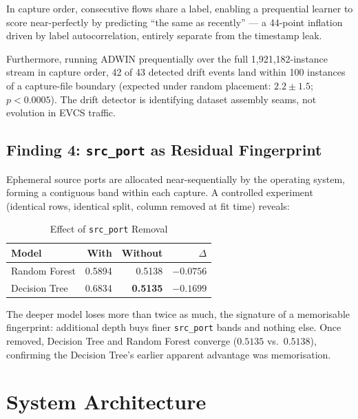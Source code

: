 \documentclass[conference]{IEEEtran}
\newcommand{\col}[1]{\texttt{\small #1}}
\begin{document}
In capture order, consecutive flows share a label, enabling a prequential learner to score near-perfectly by predicting ``the same as recently'' --- a 44-point inflation driven by label autocorrelation, entirely separate from the timestamp leak.

Furthermore, running ADWIN prequentially over the full 1,921,182-instance stream in capture order, 42 of 43 detected drift events land within 100 instances of a capture-file boundary (expected under random placement: $2.2 \pm 1.5$; $p < 0.0005$). The drift detector is identifying dataset assembly seams, not evolution in EVCS traffic.

\subsection{Finding 4: \col{src\_port} as Residual Fingerprint}
\label{sec:srcport}

Ephemeral source ports are allocated near-sequentially by the operating system, forming a contiguous band within each capture. A controlled experiment (identical rows, identical split, column removed at fit time) reveals:

\begin{table}[htbp]
\caption{Effect of \col{src\_port} Removal}
\centering
\begin{tabular}{lrrr}
\toprule
\textbf{Model} & \textbf{With} & \textbf{Without} & \textbf{$\Delta$} \\
\midrule
Random Forest & 0.5894 & 0.5138 & $-0.0756$ \\
Decision Tree & 0.6834 & \textbf{0.5135} & $\mathbf{-0.1699}$ \\
\bottomrule
\end{tabular}
\label{tab:srcport}
\end{table}

The deeper model loses more than twice as much, the signature of a memorisable fingerprint: additional depth buys finer \col{src\_port} bands and nothing else. Once removed, Decision Tree and Random Forest converge ($0.5135$ vs.\ $0.5138$), confirming the Decision Tree's earlier apparent advantage was memorisation.

\section{System Architecture}
\label{sec:architecture}
\end{document}
